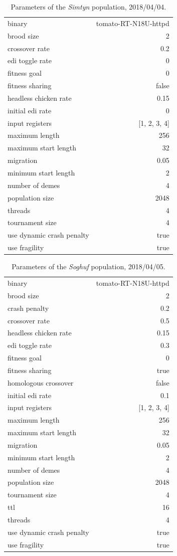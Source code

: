 \documentclass[12pt,glossary]{dalthesis}
\begin{document}
\begin{table}[htbp]
\caption{Parameters of the \emph{Simtyn} population, 2018/04/04.}
\centering
\begin{tabular}{lr}
binary & tomato-RT-N18U-httpd\\
brood size & 2\\
crossover rate & 0.2\\
edi toggle rate & 0\\
fitness goal & 0\\
fitness sharing & false\\
headless chicken rate & 0.15\\
initial edi rate & 0\\
input registers & [1, 2, 3, 4]\\
maximum length & 256\\
maximum start length & 32\\
migration & 0.05\\
minimum start length & 2\\
number of demes & 4\\
population size & 2048\\
threads & 4\\
tournament size & 4\\
use dynamic crash penalty & true\\
use fragility & true\\
\end{tabular}
\end{table}

\begin{table}[htbp]
\caption{Parameters of the \emph{Soghuf} population, 2018/04/05.}
\centering
\begin{tabular}{lr}
binary & tomato-RT-N18U-httpd\\
brood size & 2\\
crash penalty & 0.2\\
crossover rate & 0.5\\
headless chicken rate & 0.15\\
edi toggle rate & 0.3\\
fitness goal & 0\\
fitness sharing & true\\
homologous crossover & false\\
initial edi rate & 0.1\\
input registers & [1, 2, 3, 4]\\
maximum length & 256\\
maximum start length & 32\\
migration & 0.05\\
minimum start length & 2\\
number of demes & 4\\
population size & 2048\\
tournament size & 4\\
ttl & 16\\
threads & 4\\
use dynamic crash penalty & true\\
use fragility & true\\
\end{tabular}
\end{table}
\end{document}

